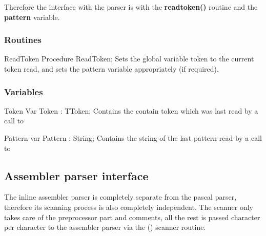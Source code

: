 \documentclass [12pt]{article}
\begin{document}
Therefore the interface with the parser is with the \textbf{readtoken()} 
routine and the \textbf{pattern} variable.

\subsubsection{Routines}
\label{subsubsec:routinese}

\begin{procedure}{ReadToken}
\Declaration
Procedure ReadToken;
\Description
Sets the global variable \textsf{token} to the current token read, and sets
the \textsf{pattern} variable appropriately (if required). 
\end{procedure}


\subsubsection{Variables}
\label{subsubsec:variablesglobal}

\begin{variable}{Token}
\Description
Var Token : TToken;
\Description
Contains the contain token which was last read by a call to 
\SeeAlso
\end{variable}


\begin{variable}{Pattern}
\Declaration
var Pattern : String;
\Description
Contains the string of the last pattern read by a call to
\SeeAlso
\end{variable}


\subsection{Assembler parser interface}
\label{subsec:assembler}

The inline assembler parser is completely separate from the pascal parser, 
therefore its scanning process is also completely independent. The scanner 
only takes care of the preprocessor part and comments, all the rest is 
passed character per character to the assembler parser via the 
() scanner routine.
\end{document}
